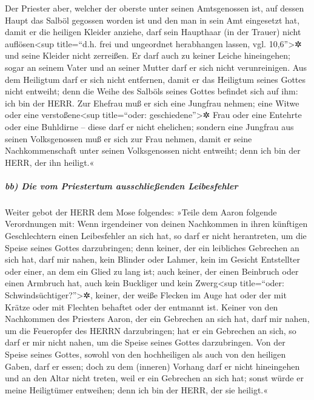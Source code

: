 Der Priester aber, welcher der oberste unter seinen
Amtsgenossen ist, auf dessen Haupt das Salböl gegossen worden ist und
den man in sein Amt eingesetzt hat, damit er die heiligen Kleider
anziehe, darf sein Haupthaar (in der Trauer) nicht auflösen\textless sup
title=``d.h. frei und ungeordnet herabhangen lassen, vgl.
10,6''\textgreater✲ und seine Kleider nicht zerreißen. Er
darf auch zu keiner Leiche hineingehen; sogar an seinem Vater und an
seiner Mutter darf er sich nicht verunreinigen. Aus dem
Heiligtum darf er sich nicht entfernen, damit er das Heiligtum seines
Gottes nicht entweiht; denn die Weihe des Salböls seines Gottes befindet
sich auf ihm: ich bin der HERR. Zur Ehefrau muß er sich
eine Jungfrau nehmen; eine Witwe oder eine
verstoßene\textless sup title=``oder: geschiedene''\textgreater✲ Frau
oder eine Entehrte oder eine Buhldirne -- diese darf er nicht ehelichen;
sondern eine Jungfrau aus seinen Volksgenossen muß er sich zur Frau
nehmen, damit er seine Nachkommenschaft unter seinen
Volksgenossen nicht entweiht; denn ich bin der HERR, der ihn heiligt.«

\hypertarget{bb-die-vom-priestertum-ausschlieuxdfenden-leibesfehler}{%
\subparagraph{bb) Die vom Priestertum ausschließenden
Leibesfehler}\label{bb-die-vom-priestertum-ausschlieuxdfenden-leibesfehler}}

Weiter gebot der HERR dem Mose folgendes:
»Teile dem Aaron folgende Verordnungen mit: Wenn
irgendeiner von deinen Nachkommen in ihren künftigen Geschlechtern einen
Leibesfehler an sich hat, so darf er nicht herantreten, um die Speise
seines Gottes darzubringen; denn keiner, der ein
leibliches Gebrechen an sich hat, darf mir nahen, kein Blinder oder
Lahmer, kein im Gesicht Entstellter oder einer, an dem ein Glied zu lang
ist; auch keiner, der einen Beinbruch oder einen Armbruch
hat, auch kein Buckliger und kein Zwerg\textless sup
title=``oder: Schwindsüchtiger?''\textgreater✲, keiner, der weiße
Flecken im Auge hat oder der mit Krätze oder mit Flechten behaftet oder
der entmannt ist. Keiner von den Nachkommen des Priesters
Aaron, der ein Gebrechen an sich hat, darf mir nahen, um die Feueropfer
des HERRN darzubringen; hat er ein Gebrechen an sich, so darf er mir
nicht nahen, um die Speise seines Gottes darzubringen.
Von der Speise seines Gottes, sowohl von den hochheiligen
als auch von den heiligen Gaben, darf er essen; doch zu
dem (inneren) Vorhang darf er nicht hineingehen und an den Altar nicht
treten, weil er ein Gebrechen an sich hat; sonst würde er meine
Heiligtümer entweihen; denn ich bin der HERR, der sie heiligt.«

